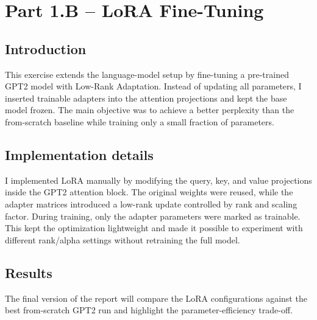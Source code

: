 \section{Part 1.B -- LoRA Fine-Tuning}

\subsection*{Introduction}
This exercise extends the language-model setup by fine-tuning a pre-trained GPT2 model with Low-Rank Adaptation. Instead of updating all parameters, I inserted trainable adapters into the attention projections and kept the base model frozen. The main objective was to achieve a better perplexity than the from-scratch baseline while training only a small fraction of parameters.

\subsection*{Implementation details}
I implemented LoRA manually by modifying the query, key, and value projections inside the GPT2 attention block. The original weights were reused, while the adapter matrices introduced a low-rank update controlled by rank and scaling factor. During training, only the adapter parameters were marked as trainable. This kept the optimization lightweight and made it possible to experiment with different rank/alpha settings without retraining the full model.

\subsection*{Results}
The final version of the report will compare the LoRA configurations against the best from-scratch GPT2 run and highlight the parameter-efficiency trade-off.